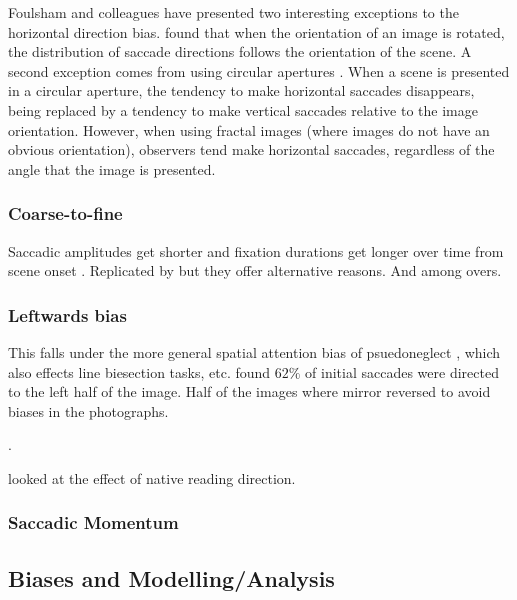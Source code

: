 \documentclass[a4paper, twocolumn, oneside, 10pt]{article}
\begin{document}
Foulsham and colleagues have presented two interesting exceptions to the horizontal direction bias. \cite{Foulsham2008} found that when the orientation of an image is rotated, the distribution of saccade directions follows the orientation of the scene. A second exception comes from using circular apertures \citep{Foulsham-kingstone2010}. When a scene is presented in a circular aperture, the tendency to make horizontal saccades disappears, being replaced by a tendency to make vertical saccades relative to the image orientation. However, when using fractal images (where images do not have an obvious orientation), observers tend make horizontal saccades, regardless of the angle that the image is presented.

\subsubsection{Coarse-to-fine}

Saccadic amplitudes get shorter and fixation durations get longer over time from scene onset \citep{over2007}. Replicated by \cite{godwin2014} but they offer alternative reasons. And \cite{macinnes2014}
among overs. 


\subsubsection{Leftwards bias}

This falls under the more general spatial attention bias of psuedoneglect \citep{bowers-heilman1980}, which also effects line biesection tasks, etc. \cite{dickinson-intraub2009} found $62\%$ of initial saccades were directed to the left half of the image. Half of the images where mirror reversed to avoid biases in the photographs.

\citep{ossandon2014,nuthmann-matthias2014,learmonth2015,zelinsky1996}. 



\cite{friedrich2014} looked at the effect of native reading direction. 

\subsubsection{Saccadic Momentum}

 \cite{macinnes2014, tatler-vincent20xx}

\subsection{Biases and Modelling/Analysis}
\end{document}
